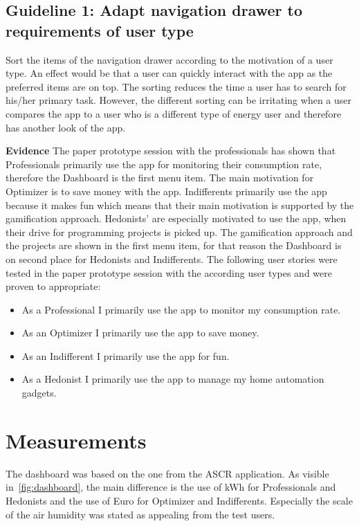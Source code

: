 \subsection*{Guideline 1: Adapt navigation drawer to requirements of user type}

 Sort the items of the navigation drawer according to the motivation of a user type. An effect would be that a user can quickly interact with the app as the preferred items are on top. The sorting reduces the time a user has to search for his/her primary task. However, the different sorting can be irritating when a user compares the app to a user who is a different type of energy user and therefore has another look of the app.
 
\textbf{Evidence} \quad The paper prototype session with the professionals has shown that Professionals primarily use the app for monitoring their consumption rate, therefore the Dashboard is the first menu item. The main motivation for Optimizer is to save money with the app. Indifferents primarily use the app because it makes fun which means that their main motivation is supported by the gamification approach. Hedonists' are especially motivated to use the app, when their drive for programming projects is picked up. The gamification approach and the projects are shown in the first menu item, for that reason the Dashboard is on second place for Hedonists and Indifferents. The following user stories were tested in the paper prototype session with the according user types and were proven to appropriate:
\begin{itemize}
	\item As a Professional I primarily use the app to monitor my consumption rate.
	\item As an Optimizer I primarily use the app to save money.
	\item As an Indifferent I primarily use the app for fun.
	\item As a Hedonist I primarily use the app to manage my home automation gadgets.
\end{itemize}


\section{Measurements}

The dashboard was based on the one from the ASCR application. As visible in~\ref{fig:dashboard}, the main difference is the use of kWh for Professionals and Hedonists and the use of Euro for Optimizer and Indifferents. Especially the scale of the air humidity was stated as appealing from the test users.

